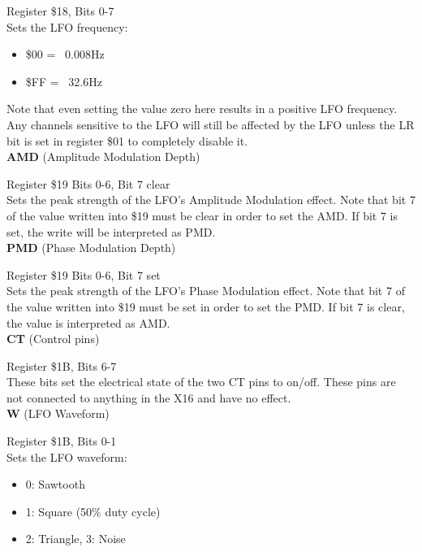 Register \$18, Bits 0-7\\

Sets the LFO frequency:

\begin{itemize}
	\item \$00 = ~0.008Hz
	\item \$FF = ~32.6Hz
\end{itemize}

\vspace{16pt}

Note that even setting the value zero here results in a positive LFO frequency.
Any channels sensitive to the LFO will still be affected by the LFO unless the
{\ttfamily LR} bit is set in register \$01 to completely disable it.\\

{\bfseries AMD} (Amplitude Modulation Depth)

Register \$19 Bits 0-6, Bit 7 clear\\

Sets the peak strength of the LFO's Amplitude Modulation effect. Note that bit
7 of the value written into \$19 must be clear in order to set the AMD. If bit 7
is set, the write will be interpreted as PMD.\\

{\bfseries PMD} (Phase Modulation Depth)

Register \$19 Bits 0-6, Bit 7 set\\

Sets the peak strength of the LFO's Phase Modulation effect. Note that bit 7 of
the value written into \$19 must be set in order to set the PMD. If bit 7 is
clear, the value is interpreted as AMD.\\

{\bfseries CT} (Control pins)

Register \$1B, Bits 6-7\\

These bits set the electrical state of the two CT pins to on/off. These pins
are not connected to anything in the X16 and have no effect.\\

{\bfseries W} (LFO Waveform)

Register \$1B, Bits 0-1\\

Sets the LFO waveform:

\begin{itemize}
	\item 0: Sawtooth
	\item 1: Square (50\% duty cycle)
	\item 2: Triangle, 3: Noise
\end{itemize}

